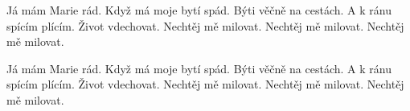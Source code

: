 \repeatingchorus{}
\beginchorus{}
Já mám Marie rád. Když má moje bytí spád.
Býti věčně na cestách. A k ránu spícím plícím.
Život vdechovat. Nechtěj mě milovat.
Nechtěj mě milovat. Nechtěj mě milovat. 
\endchorus{}

\repeatingchorus{}
\beginchorus{}
Já mám Marie rád. Když má moje bytí spád.
Býti věčně na cestách. A k ránu spícím plícím.
Život vdechovat. Nechtěj mě milovat.
Nechtěj mě milovat. Nechtěj mě milovat. 
\endchorus{}

\endsong{}
